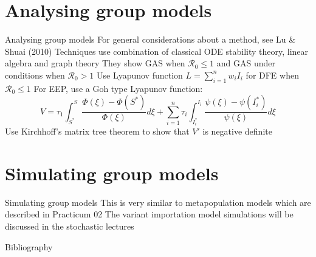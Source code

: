 \documentclass[aspectratio=169]{beamer}\usepackage[]{graphicx}\usepackage[]{xcolor}
\begin{document}

\section{Analysing group models}
\begin{frame}{Analysing group models}
\bbullet For general considerations about a method, see Lu \& Shuai (2010)
\bbullet Techniques use combination of classical ODE stability theory, linear algebra and graph theory
\bbullet They show GAS when $\mathcal{R}_0\leq 1$ and GAS under conditions when $\mathcal{R}_0>1$
\bbullet Use Lyapunov function $L=\sum_{i=1}^nw_iI_i$ for DFE when $\mathcal{R}_0\leq 1$
\bbullet For EEP, use a Goh type Lyapunov function:
\[
V=\tau_1\int_{S^*}^{S}\frac{\Phi(\xi)-\Phi(S^*)}{\Phi(\xi)}d\xi+\sum_{i=1}^n\tau_i\int_{I_i^*}^{I_i}\frac{\psi(\xi)-\psi(I_i^*)}{\psi(\xi)}d\xi
\]
\bbullet Use Kirchhoff’s matrix tree theorem to show that $V'$ is negative definite
\end{frame}

\section{Simulating group models}
\begin{frame}{Simulating group models}
\bbullet This is very similar to metapopulation models which are described in Practicum 02
\bbullet The variant importation model simulations will be discussed in the stochastic lectures
\end{frame}


\begin{frame}[allowframebreaks]{Bibliography}


\end{frame}
\end{document}
